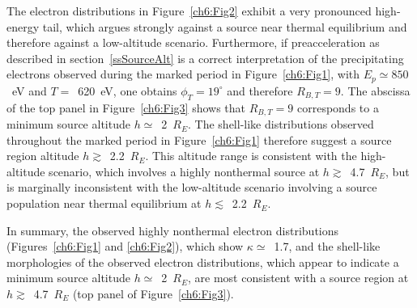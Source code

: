 

  The electron distributions in Figure~\ref{ch6:Fig2} exhibit a
  very pronounced high-energy tail, which argues strongly against a source near
  thermal equilibrium and therefore against a low-altitude scenario. Furthermore, if
  preacceleration as described in section~\ref{ssSourceAlt} is a correct
  interpretation of the precipitating electrons observed during the marked
  period in Figure~\ref{ch6:Fig1}, with $E_p \simeq 850$~eV and $T =$~620~eV,
  one obtains $\phi_T = 19^\circ$ and therefore $R_{B,T} = 9$. The abscissa of
  the top panel in Figure~\ref{ch6:Fig3} shows that $R_{B,T} = 9$ corresponds to
  a minimum source altitude $h \simeq$~2~$R_E$. The shell-like distributions
  observed throughout the marked period in Figure~\ref{ch6:Fig1} therefore
  suggest a source region altitude $h \gtrsim$~2.2~$R_E$. This altitude range is
  consistent with the high-altitude scenario, which involves a highly nonthermal
  source at $h \gtrsim$~4.7~$R_E$, but is marginally inconsistent with the
  low-altitude scenario involving a source population near thermal equilibrium
  at $h \lesssim$~2.2~$R_E$.

  In summary, the observed highly nonthermal electron distributions
  (Figures~\ref{ch6:Fig1} and \ref{ch6:Fig2}), which show $\kappa \simeq$~1.7,
  and the shell-like morphologies of the observed electron distributions, which
  appear to indicate a minimum source altitude $h \simeq$~2~$R_E$, are most
  consistent with a source region at $h \gtrsim$~4.7~$R_E$ (top panel of
  Figure~\ref{ch6:Fig3}).

